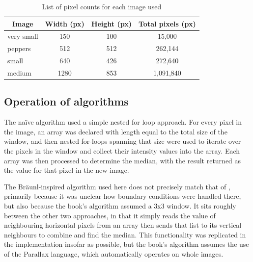 \begin{table}
\centering
\caption{List of pixel counts for each image used}
\label{tab:pixelcounts}
\begin{tabular}{@{}lccc@{}}
\toprule
\multicolumn{1}{c}{\textbf{Image}} & \multicolumn{1}{c}{\textbf{Width (px)}} & \multicolumn{1}{c}{\textbf{Height (px)}} & \multicolumn{1}{c}{\textbf{Total pixels (px)}} \\ \midrule
very small                         & 150                                     & 100                                      & 15,000                                         \\
peppers                            & 512                                     & 512                                      & 262,144                                        \\
small                              & 640                                     & 426                                      & 272,640                                        \\
medium                             & 1280                                    & 853                                      & 1,091,840                                      \\ \bottomrule
\end{tabular}
\end{table}

\subsection{Operation of algorithms}
The na\"{i}ve algorithm used a simple nested for loop approach.  For every pixel in the image, an array was declared with length equal to the total size of the window, and then nested for-loops spanning that size were used to iterate over the pixels in the window and collect their intensity values into the array.  Each array was then processed to determine the median, with the result returned as the value for that pixel in the new image.

The Bräunl-inspired algorithm used here does not precisely match that of \cite{Braunl2001}, primarily because it was unclear how boundary conditions were handled there, but also because the book's algorithm assumed a 3x3 window.  It sits roughly between the other two approaches, in that it simply reads the value of neighbouring horizontal pixels from an array then sends that list to its vertical neighbours to combine and find the median.  This functionality was replicated in the implementation insofar as possible, but the book's algorithm assumes the use of the Parallax language, which automatically operates on whole images.

